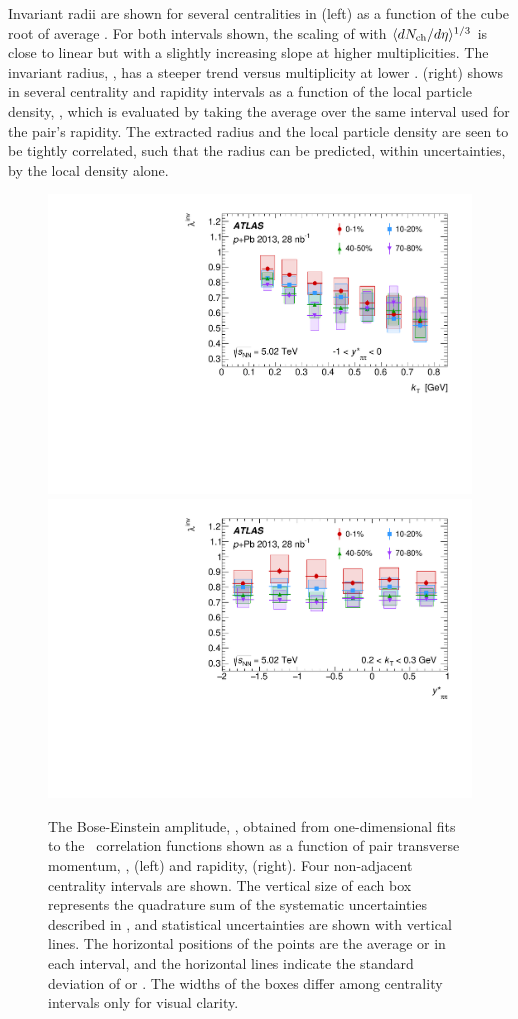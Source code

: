 Invariant radii are shown for several centralities in  (left) as a function of the cube root of average \dNdeta. 
For both \kt intervals shown, the scaling of \Rinv with $\langle d\mbox{$N_{\mathrm{ch}}$}/d\eta\rangle^{1/3}$ is close to linear but with a slightly increasing slope at higher multiplicities.
The invariant radius, \Rinv, has a steeper trend versus multiplicity at lower \kt.
 (right) shows \Rinv in several centrality and rapidity intervals as a function of the local particle density, \dNdy, which is evaluated by taking the average over the same interval used for the pair's rapidity.
The extracted radius and the local particle density are seen to be tightly correlated, such that the radius can be predicted, within uncertainties, by the local density alone.

\begin{figure}[t]
\centering
\includegraphics[width=0.49\linewidth]{canqinv_x_vs_kt.pdf}
\includegraphics[width=0.49\linewidth]{canqinv_x_vs_kys.pdf}
\caption{The Bose-Einstein amplitude, \linv, obtained from one-dimensional fits to the \qinv\ correlation functions shown as a function of pair transverse momentum, \kt, (left) and rapidity, \kys (right). Four non-adjacent centrality intervals are shown. The vertical size of each box represents the quadrature sum of the systematic uncertainties described in , and statistical uncertainties are shown with vertical lines. The horizontal positions of the points are the average \kt or \kys in each interval, and the horizontal lines indicate the standard deviation of \kt or \kys. The widths of the boxes differ among centrality intervals only for visual clarity.}
\label{fig:results_qinv_x}
\end{figure}

